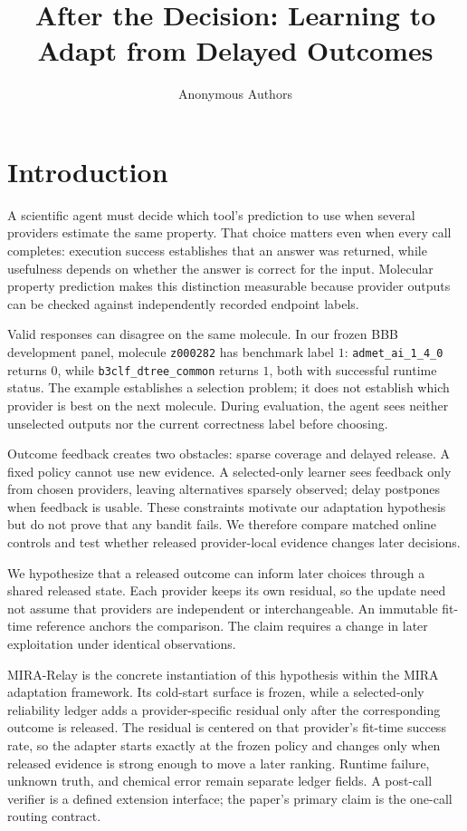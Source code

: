 \documentclass[sigconf,anonymous]{aamas}
\title{After the Decision: Learning to Adapt from Delayed Outcomes}
\author{Anonymous Authors}
\begin{document}
\maketitle

\section{Introduction}
A scientific agent must decide which tool's prediction to use when several providers estimate the same property. That choice matters even when every call completes: execution success establishes that an answer was returned, while usefulness depends on whether the answer is correct for the input. Molecular property prediction makes this distinction measurable because provider outputs can be checked against independently recorded endpoint labels.

Valid responses can disagree on the same molecule. In our frozen BBB development panel, molecule \texttt{z000282} has benchmark label $1$: \texttt{admet\_ai\_1\_4\_0} returns $0$, while \texttt{b3clf\_dtree\_common} returns $1$, both with successful runtime status. The example establishes a selection problem; it does not establish which provider is best on the next molecule. During evaluation, the agent sees neither unselected outputs nor the current correctness label before choosing.

Outcome feedback creates two obstacles: sparse coverage and delayed release. A fixed policy cannot use new evidence. A selected-only learner sees feedback only from chosen providers, leaving alternatives sparsely observed; delay postpones when feedback is usable. These constraints motivate our adaptation hypothesis but do not prove that any bandit fails. We therefore compare matched online controls and test whether released provider-local evidence changes later decisions.

We hypothesize that a released outcome can inform later choices through a shared released state. Each provider keeps its own residual, so the update need not assume that providers are independent or interchangeable. An immutable fit-time reference anchors the comparison. The claim requires a change in later exploitation under identical observations.

MIRA-Relay is the concrete instantiation of this hypothesis within the MIRA adaptation framework. Its cold-start surface is frozen, while a selected-only reliability ledger adds a provider-specific residual only after the corresponding outcome is released. The residual is centered on that provider's fit-time success rate, so the adapter starts exactly at the frozen policy and changes only when released evidence is strong enough to move a later ranking. Runtime failure, unknown truth, and chemical error remain separate ledger fields. A post-call verifier is a defined extension interface; the paper's primary claim is the one-call routing contract.
\end{document}
